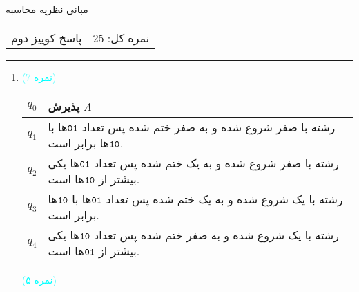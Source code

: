 \documentclass{article}
\begin{document}
	\begin{center}
		\Huge
		مبانی نظریه محاسبه
	\end{center}
	\Large
	\begin{tabularx}{\linewidth}{>{\raggedleft\arraybackslash}X>{\raggedright\arraybackslash}X}
		پاسخ کوییز  دوم
		&
		نمره کل: 25
	\end{tabularx}
	\rule{\textwidth}{1pt}
	\large
	\begin{enumerate}
		\item 
		
		\textcolor{cyan}{
			(7 نمره)
		}
		
		\begin{minipage}{0.5\textwidth}
			\begin{tabularx}{\linewidth}{|c|X|}
				\hline
				$q_0$ &					
پذیرش $\Lambda$ 
				\\ \hline
				$q_1$ &					
رشته با صفر شروع شده و به صفر ختم شده پس تعداد $ \tt 01 $ها با $\tt 10 $ها برابر است.
				\\ \hline
				$q_2$ &			
رشته با صفر شروع شده و به یک ختم شده پس تعداد $ \tt 01 $ها یکی بیشتر از $\tt 10 $ها است.
				\\ \hline
				$q_3$ &				
رشته با یک شروع شده و به یک ختم شده پس تعداد $ \tt 01 $ها با $\tt 10 $ها برابر است.
				\\ \hline
				$q_4$ &					
رشته با یک شروع شده و به صفر ختم شده پس تعداد $\tt 10 $ها یکی بیشتر از $ \tt 01 $ها است.
				\\ \hline
			\end{tabularx}
		\end{minipage}
		\begin{minipage}{0.5\textwidth}
		\end{minipage}
		\begin{center}
			\textcolor{cyan}{
				(۵ نمره)
			}
		\end{center}


\end{enumerate}
\end{document}
